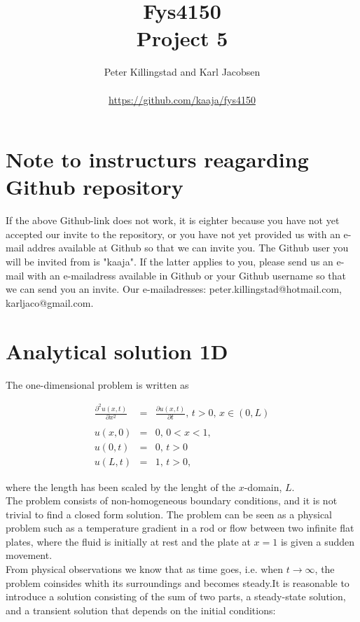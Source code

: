 \documentclass{article}
\title{Fys4150\\Project 5\\ }
\author{Peter Killingstad and Karl Jacobsen\\
\\
\url{https://github.com/kaaja/fys4150}}
\begin{document}
	
\maketitle

\section*{Note to instructurs reagarding Github repository}
If the above Github-link does not work, it is eighter because you have not yet accepted our invite to the repository, or you have not yet provided us with an e-mail addres available at Github so that we can invite you. The Github user you will be invited from is "kaaja". If the latter applies to you, please send us an e-mail with an e-mailadress available in Github or your Github username so that we can send you an invite. Our e-mailadresses: peter.killingstad@hotmail.com, karljaco@gmail.com.


\section{Analytical solution 1D}
The one-dimensional problem is written as 

\begin{subequations}
	\begin{eqnarray}
	\frac{\partial^2 u(x,t)}{\partial x^2} &=& \frac{\partial u(x,t)}{\partial t} \textit{, } t> 0 \textit{, } x \in (0,L) \\ \nonumber
	\\
	u(x,0) &=& 0 \textit{, } 0 <x < 1 \textit{,} \\
	u(0,t) &=& 0 \textit{, } t>0 \\
	u(L,t) &=& 1 \textit{, } t>0,
	\end{eqnarray}
\end{subequations}

where the length has been scaled by the lenght of the $x$-domain, $L$.\\

The problem consists of non-homogeneous boundary conditions, and it is not trivial to find a closed form solution. The problem can be seen as a physical problem such as a temperature gradient in a rod or flow between two infinite flat plates, where the fluid is initially at rest and the plate at $x=1$ is given a sudden movement. \\

From physical observations we know that as time goes, i.e. when $t\rightarrow \infty$,  the problem coinsides whith its surroundings and becomes steady.It is reasonable to introduce a solution consisting of the sum of two parts, a steady-state solution, and a transient solution that depends on the initial conditions:
\end{document}
